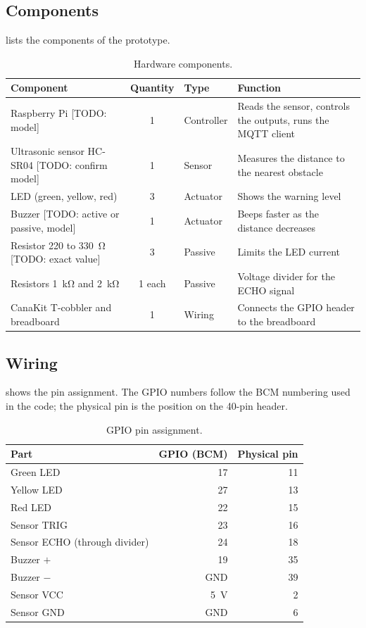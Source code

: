 \documentclass[11pt,a4paper]{article}
\newcommand{\todo}[1]{\textcolor{red!75!black}{[TODO: #1]}}
\begin{document}
\subsection{Components}
\label{sec:components}
 lists the components of the prototype.

\begin{table}[htbp]
  \centering
  \caption{Hardware components.}
  \label{tab:components}
  \begin{tabularx}{\textwidth}{@{}>{\raggedright\arraybackslash}X c l >{\raggedright\arraybackslash}X@{}}
    \toprule
    Component         & Quantity & Type       & Function \\
    \midrule
    Raspberry Pi \todo{model} & 1 & Controller & Reads the sensor, controls the outputs, runs the MQTT client \\
    Ultrasonic sensor HC-SR04 \todo{confirm model} & 1 & Sensor & Measures the distance to the nearest obstacle \\
    LED (green, yellow, red) & 3 & Actuator & Shows the warning level \\
    Buzzer \todo{active or passive, model} & 1 & Actuator & Beeps faster as the distance decreases \\
    Resistor 220 to \qty{330}{\ohm} \todo{exact value} & 3 & Passive & Limits the LED current \\
    Resistors \qty{1}{\kilo\ohm} and \qty{2}{\kilo\ohm} & 1 each & Passive & Voltage divider for the ECHO signal \\
    CanaKit T-cobbler and breadboard & 1 & Wiring & Connects the GPIO header to the breadboard \\
    \bottomrule
  \end{tabularx}
\end{table}

\subsection{Wiring}
\label{sec:wiring}
 shows the pin assignment. The GPIO numbers follow the BCM
numbering used in the code; the physical pin is the position on the 40-pin
header.

\begin{table}[htbp]
  \centering
  \caption{GPIO pin assignment.}
  \label{tab:pins}
  \begin{tabular}{@{}lrr@{}}
    \toprule
    Part & GPIO (BCM) & Physical pin \\
    \midrule
    Green LED   & 17  & 11 \\
    Yellow LED  & 27  & 13 \\
    Red LED     & 22  & 15 \\
    Sensor TRIG & 23  & 16 \\
    Sensor ECHO (through divider) & 24 & 18 \\
    Buzzer $+$  & 19  & 35 \\
    Buzzer $-$  & GND & 39 \\
    Sensor VCC  & \qty{5}{\volt} & 2 \\
    Sensor GND  & GND & 6 \\
    \bottomrule
  \end{tabular}
\end{table}
\end{document}
